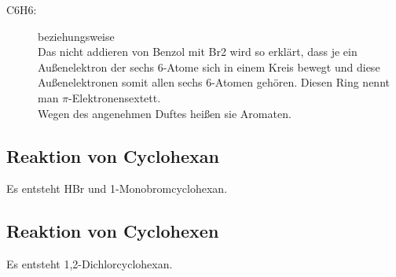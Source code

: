 \begin{description}
	\item[\ac{C6H6}:] 
		\hspace{3em}beziehungsweise\hspace{3em}  \\[0.8ex]
		Das nicht addieren von Benzol mit \ac{Br2} wird so erklärt,
		dass je ein Außenelektron der sechs \ac{6}-Atome sich in einem Kreis bewegt
		und diese Außenelektronen somit allen sechs \ac{6}-Atomen gehören.
		Diesen Ring nennt man $\pi$-Elektronensextett. \\
		Wegen des angenehmen Duftes heißen sie Aromaten.
\end{description}

\subsection{Reaktion von Cyclohexan}
\begin{minipage}{10.7em}
\end{minipage}
\begin{minipage}{11.8em}
\ce{+\,} 
\ce{->}  \ce{\,+}
\end{minipage}
\begin{minipage}{10em}
\end{minipage}

Es entsteht \ac{HBr} und 1-Monobromcyclohexan.

\subsection{Reaktion von Cyclohexen}
\begin{minipage}{10.7em}
\end{minipage}
\begin{minipage}{7em}
\ce{+\,} 
\ce{->}
\end{minipage}
\begin{minipage}{10em}
\end{minipage}

Es entsteht 1,2-Dichlorcyclohexan.
